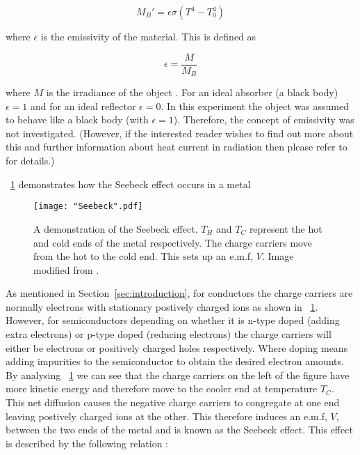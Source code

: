 \documentclass{article}
\newcommand{\figref}[2][\figurename~]{#1\ref{#2}}
\newcommand{\secref}[2][Section~]{#1\ref{#2}}
\begin{document}
\begin{equation}
\label{eq:Net-Power2}
M_B ' = \epsilon \sigma (T^4 - T_0^4)
\end{equation}

\vspace{2mm}
\noindent
where $\epsilon$ is the emissivity of the material. This is defined as

\begin{equation}
\label{eq:Emissivity}
\epsilon = \frac{M}{M_B}
\end{equation}

\vspace{2mm}
\noindent
where $M$ is the irradiance of the object \cite{Paper01}. For an ideal absorber (a black body) $\epsilon = 1$ and for an ideal reflector $\epsilon = 0$. In this experiment the object was  assumed to behave like a black body (with $\epsilon = 1$). Therefore, the concept of emissivity was not investigated. (However, if the interested reader wishes to find out more about this and further information about heat current in radiation then please refer to \cite{Book01} for details.)

\vspace{2mm}
\noindent
\figref{fig:Seebeck} demonstrates how the Seebeck effect occurs in a metal

\begin{figure}[h]
\centering
\texttt{[image: "Seebeck".pdf]}
\caption{A demonstration of the Seebeck effect. $T_H$ and $T_C$ represent the hot and cold ends of the metal respectively. The charge carriers move from the hot to the cold end. This sets up an e.m.f, $V$. Image modified from  \cite{Paper02}.}
\label{fig:Seebeck}
\end{figure}

\vspace{2mm}
\noindent
As mentioned in \secref{sec:introduction}, for conductors the charge carriers are normally electrons with stationary postively charged ions as shown in \figref{fig:Seebeck}. However, for semiconductors depending on whether it is n-type doped (adding extra electrons) or p-type doped (reducing electrons) the charge carriers will either be electrons or positively charged holes respectively. Where doping means adding impurities to the semiconductor to obtain the desired electron amounts. By analysing \figref{fig:Seebeck} we can see that the charge carriers on the left of the figure have more kinetic energy and therefore move to the cooler end at temperature $T_C$. This net diffusion causes the negative charge carriers to congregate at one end leaving postively charged ions at the other. This therefore induces an e.m.f, $V$, between the two ends of the metal and is known as the Seebeck effect. This effect is described by the following relation \cite{Paper02}:
\end{document}
